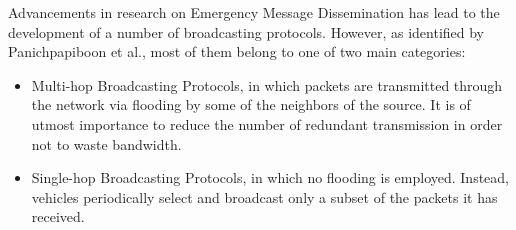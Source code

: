 		Advancements in research on Emergency Message Dissemination has lead to the development of a number of broadcasting protocols. However, as identified by Panichpapiboon et al.\cite{5989903}, most of them belong to one of two main categories:
		\begin{itemize}
			\item Multi-hop Broadcasting Protocols, in which packets are transmitted through the network via flooding by some of the neighbors of the source. It is of utmost importance to reduce the number of redundant transmission in order not to waste bandwidth.
			\item Single-hop Broadcasting Protocols, in which no flooding is employed. Instead, vehicles periodically select and broadcast only a subset of the packets it has received.
		\end{itemize}
		
